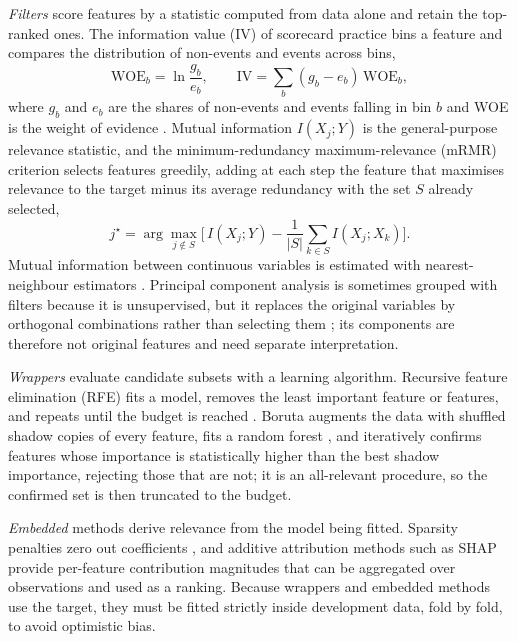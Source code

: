 \documentclass[preprint,12pt]{elsarticle}
\begin{document}
\emph{Filters} score features by a statistic computed from data alone and retain the top-ranked ones. The information value (IV) of scorecard practice bins a feature and compares the distribution of non-events and events across bins,
\begin{equation}
    \mathrm{WOE}_b=\ln\frac{g_b}{e_b},\qquad
    \mathrm{IV}=\sum_{b}(g_b-e_b)\,\mathrm{WOE}_b,
    \label{eq:iv}
\end{equation}
where $g_b$ and $e_b$ are the shares of non-events and events falling in bin $b$ and WOE is the weight of evidence \cite{siddiqi2006}. Mutual information $I(X_j;Y)$ is the general-purpose relevance statistic, and the minimum-redundancy maximum-relevance (mRMR) criterion \cite{peng2005} selects features greedily, adding at each step the feature that maximises relevance to the target minus its average redundancy with the set $S$ already selected,
\begin{equation}
    j^{\star}=\arg\max_{j\notin S}\Big[\,I(X_j;Y)-\frac{1}{|S|}\sum_{k\in S} I(X_j;X_k)\Big].
    \label{eq:mrmr}
\end{equation}
Mutual information between continuous variables is estimated with nearest-neighbour estimators \cite{kraskov2004,ross2014}. Principal component analysis is sometimes grouped with filters because it is unsupervised, but it replaces the original variables by orthogonal combinations rather than selecting them \cite{jolliffe2016}; its components are therefore not original features and need separate interpretation.

\emph{Wrappers} evaluate candidate subsets with a learning algorithm. Recursive feature elimination (RFE) fits a model, removes the least important feature or features, and repeats until the budget is reached \cite{guyon2002}. Boruta \cite{kursa2010} augments the data with shuffled shadow copies of every feature, fits a random forest \cite{breiman2001}, and iteratively confirms features whose importance is statistically higher than the best shadow importance, rejecting those that are not; it is an all-relevant procedure, so the confirmed set is then truncated to the budget.

\emph{Embedded} methods derive relevance from the model being fitted. Sparsity penalties zero out coefficients \cite{tibshirani1996}, and additive attribution methods such as SHAP \cite{lundberg2017} provide per-feature contribution magnitudes that can be aggregated over observations and used as a ranking. Because wrappers and embedded methods use the target, they must be fitted strictly inside development data, fold by fold, to avoid optimistic bias.
\end{document}
